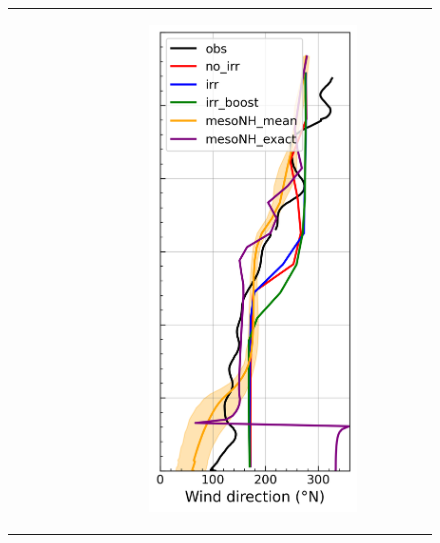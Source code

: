\begin{figure}[hbtp]
{\begin{tabular}{@{}cccc@{}}
\begin{subfigure}[t]{0.283\textwidth}
        \end{subfigure} &
        \begin{subfigure}[t]{0.283\textwidth}
            \caption{}
            \includegraphics[width=\textwidth]{images/chap5/profiles/profile_cendrosa_wind_direction_2007_.png}

\end{subfigure}
\end{tabular}}
\end{figure}
